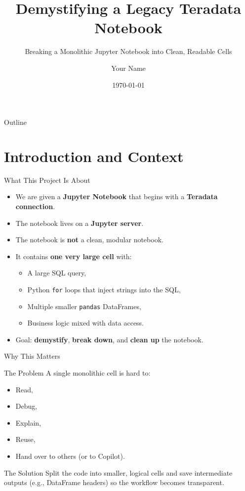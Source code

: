 \documentclass[aspectratio=169,11pt]{beamer}
\title[Notebook Cleanup \& Teradata Analysis]{Demystifying a Legacy Teradata Notebook}
\subtitle{Breaking a Monolithic Jupyter Notebook into Clean, Readable Cells}
\author{Your Name}
\institute{Your Department / Course}
\date{\today}
\begin{document}
	
	\begin{frame}
		\titlepage
	\end{frame}
	
	\begin{frame}{Outline}
		\tableofcontents
	\end{frame}
	
	\section{Introduction and Context}
	
	\begin{frame}{What This Project Is About}
		\begin{itemize}
			\item We are given a \textbf{Jupyter Notebook} that begins with a \textbf{Teradata connection}.
			\item The notebook lives on a \textbf{Jupyter server}.
			\item The notebook is \textbf{not} a clean, modular notebook.
			\item It contains \textbf{one very large cell} with:
			\begin{itemize}
				\item A large SQL query,
				\item Python \texttt{for} loops that inject strings into the SQL,
				\item Multiple smaller \texttt{pandas} DataFrames,
				\item Business logic mixed with data access.
			\end{itemize}
			\item Goal: \textbf{demystify}, \textbf{break down}, and \textbf{clean up} the notebook.
		\end{itemize}
	\end{frame}
	
	\begin{frame}{Why This Matters}
		\begin{block}{The Problem}
			A single monolithic cell is hard to:
			\begin{itemize}
				\item Read,
				\item Debug,
				\item Explain,
				\item Reuse,
				\item Hand over to others (or to Copilot).
			\end{itemize}
		\end{block}
		
		\begin{block}{The Solution}
			Split the code into smaller, logical cells and save intermediate outputs (e.g., DataFrame headers) so the workflow becomes transparent.
		\end{block}
	\end{frame}
	
\end{document}
